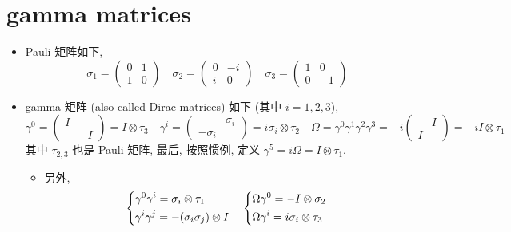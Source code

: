 \section{gamma matrices}
\begin{itemize}
	\item Pauli 矩阵如下,
	\begin{equation}
		\sigma_1 = \begin{pmatrix}
			0 & 1 \\
			1 & 0
		\end{pmatrix} \quad \sigma_2 = \begin{pmatrix}
			0 & - i \\
			i & 0
		\end{pmatrix} \quad \sigma_3 = \begin{pmatrix}
			1 & 0 \\
			0 & - 1
		\end{pmatrix}
	\end{equation}
	
	\item gamma 矩阵 (also called Dirac matrices) 如下 (其中 $i = 1, 2, 3$),
	\begin{equation}
		\gamma^0 = \begin{pmatrix}
			I & \\
			& - I
		\end{pmatrix} = I \otimes \tau_3 \quad \gamma^i = \begin{pmatrix}
			& \sigma_i \\
			- \sigma_i &
		\end{pmatrix} = i \sigma_i \otimes \tau_2 \quad \Omega = \gamma^0 \gamma^1 \gamma^2 \gamma^3 = - i \begin{pmatrix}
			& I \\
			I &
		\end{pmatrix} = - i I \otimes \tau_1
	\end{equation}
	其中 $\tau_{2, 3}$ 也是 Pauli 矩阵, 最后, 按照惯例, 定义 $\gamma^5 = i \Omega = I \otimes \tau_1$.
	\begin{itemize}
		\item 另外,
		\begin{equation}
			\begin{dcases}
				\gamma^0 \gamma^i = \sigma_i \otimes \tau_1 \\
				\gamma^i \gamma^j = - (\sigma_i \sigma_j) \otimes I
			\end{dcases} \quad \begin{dcases}
				\Omega \gamma^0 = - I \otimes \sigma_2 \\
				\Omega \gamma^i = i \sigma_i \otimes \tau_3
			\end{dcases}
		\end{equation}
	\end{itemize}
	

\end{itemize}
